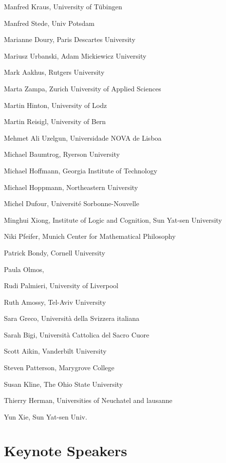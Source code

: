 \begin{compactitem}[]
		\item[] Manfred Kraus, University of Tübingen
		\item[] Manfred Stede, Univ Potsdam
		\item[] Marianne Doury, Paris Descartes University
		\item[] Mariusz Urbanski, Adam Mickiewicz University
		\item[] Mark Aakhus, Rutgers University
		\item[] Marta Zampa, Zurich University of Applied Sciences
		\item[] Martin Hinton, University of Lodz
		\item[] Martin Reisigl, University of Bern
		\item[] Mehmet Ali Uzelgun, Universidade NOVA de Lisboa
		\item[] Michael Baumtrog, Ryerson University
		\item[] Michael Hoffmann, Georgia Institute of Technology
		\item[] Michael Hoppmann, Northeastern University
		\item[] Michel Dufour, Université Sorbonne-Nouvelle
		\item[] Minghui Xiong, Institute of Logic and Cognition, Sun Yat-sen University
		\item[] Niki Pfeifer, Munich Center for Mathematical Philosophy
		\item[] Patrick Bondy, Cornell University
		\item[] Paula Olmos,
		\item[] Rudi Palmieri, University of Liverpool
		\item[] Ruth Amossy, Tel-Aviv University
		\item[] Sara Greco, Università della Svizzera italiana
		\item[] Sarah Bigi, Università Cattolica del Sacro Cuore
		\item[] Scott Aikin, Vanderbilt University
		\item[] Steven Patterson, Marygrove College
		\item[] Susan Kline, The Ohio State University
		\item[] Thierry Herman, Universities of Neuchatel and lausanne
		\item[] Yun Xie, Sun Yat-sen Univ.
	\end{compactitem}

\newpage

\section*{Keynote Speakers}
